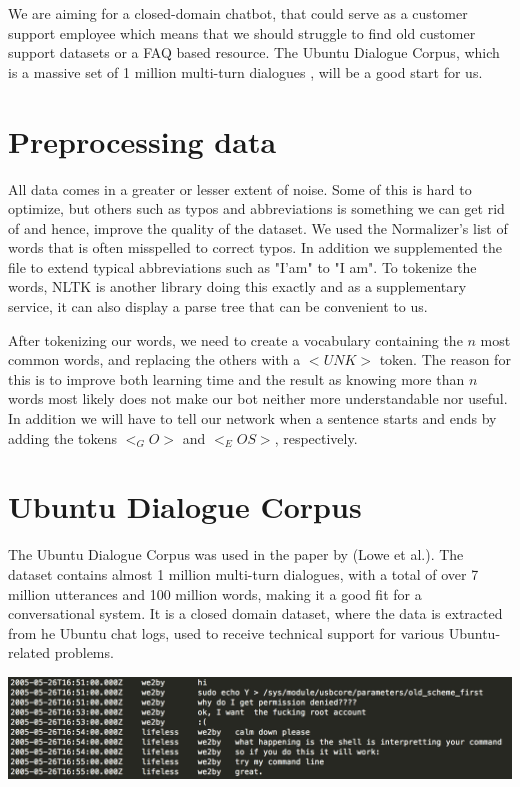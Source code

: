 \documentclass{article} %
\begin{document}
We are aiming for a closed-domain chatbot, that could serve as a customer support employee which means that we should struggle to find old customer support datasets or a FAQ based resource. The Ubuntu Dialogue Corpus, which is a massive set of 1 million multi-turn dialogues \cite{Lowe}, will be a good start for us.  %

\section{Preprocessing data}
All data comes in a greater or lesser extent of noise. Some of this is hard to optimize, but others such as typos and abbreviations is something we can get rid of and hence, improve the quality of the dataset. We used the Normalizer's \cite{Normalizer_spellfix} list of words that is often misspelled to correct typos. In addition we supplemented the file to extend typical abbreviations such as "I'am" to "I am". To tokenize the words, NLTK \cite{NLTK} is another library doing this exactly and as a supplementary service, it can also display a parse tree that can be convenient to us.

After tokenizing our words, we need to create a vocabulary containing the $n$ most common words, and replacing the others with a $<UNK>$ token. The reason for this is to improve both learning time and the result as knowing more than $n$ words most likely does not make our bot neither more understandable nor useful. In addition we will have to tell our network when a sentence starts and ends by adding the tokens $<_GO>$ and $<_EOS>$, respectively.

\section{Ubuntu Dialogue Corpus}
The Ubuntu Dialogue Corpus was used in the paper by (Lowe et al.). The dataset contains almost 1 million multi-turn dialogues, with a total of over 7 million utterances and 100 million words, making it a good fit for a conversational system. It is a closed domain dataset, where the data is extracted from he Ubuntu chat logs, used to receive technical support for various Ubuntu-related problems. \cite{Lowe}

\includegraphics[scale=0.5]{tsv_file_example} \newline
\end{document}
